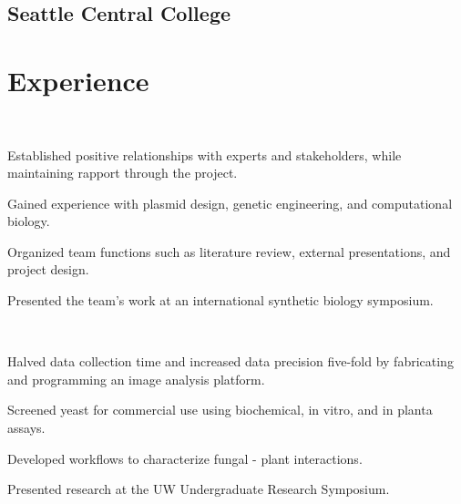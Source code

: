 \documentclass[]{forrest-resume-interfont}
\begin{document}
\subsection{Seattle Central College}

\linesep


\section{ Experience}
\\

\begin{tightemize}
    \item Established positive relationships with experts and stakeholders, while maintaining rapport through the project.
    \item Gained experience with plasmid design, genetic engineering, and computational biology.
    \item Organized team functions such as literature review, external presentations, and project design.
    \item Presented the team's work at an international synthetic biology symposium.
\end{tightemize}


\spacesep


\\

\begin{tightemize}
    \item Halved data collection time and increased data precision five-fold by fabricating and programming an image analysis platform.
   \item Screened yeast for commercial use using biochemical, in vitro, and in planta assays.
    \item Developed workflows to characterize fungal - plant interactions.
    \item Presented research at the UW Undergraduate Research Symposium.
\end{tightemize}
\linesep
\end{document}
